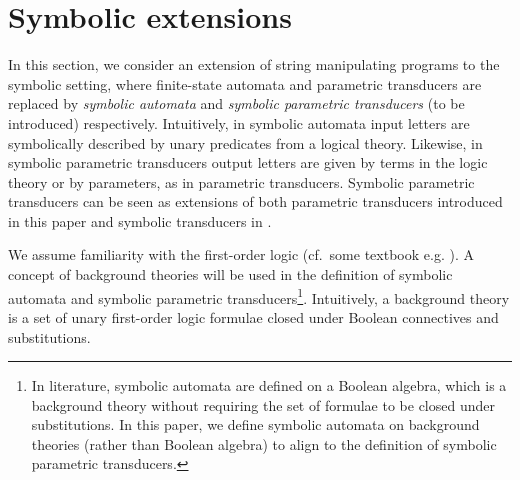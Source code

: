 
\section{Symbolic extensions}
\label{sec:symbolic}

In this section, we consider an extension of string manipulating programs to the symbolic setting, where finite-state automata and parametric transducers are replaced by \emph{symbolic automata} \cite{NG01,DV14} and \emph{symbolic parametric transducers} (to be introduced) respectively.
%
Intuitively, in symbolic automata %
input letters are symbolically described by unary predicates from a logical theory. %
%
Likewise, in symbolic parametric transducers %
output letters are given by terms in the logic theory or by parameters, as in parametric transducers.
Symbolic parametric transducers can be seen as extensions of both parametric transducers introduced in this paper and symbolic transducers in \cite{VHLMB12}.


We assume familiarity with the %
first-order logic (cf.\ some textbook e.g. \cite{EFT94}). A concept of background theories will be used in the definition of symbolic automata and symbolic parametric transducers\footnote{In literature, symbolic automata are defined on a Boolean algebra, which is a background theory without requiring the set of formulae to be closed under substitutions. In this paper, we define symbolic automata on background theories (rather than Boolean algebra) to align to the definition of symbolic parametric transducers.}.
Intuitively, 
a background theory is a set of unary first-order logic formulae closed under Boolean connectives and substitutions. 
 
